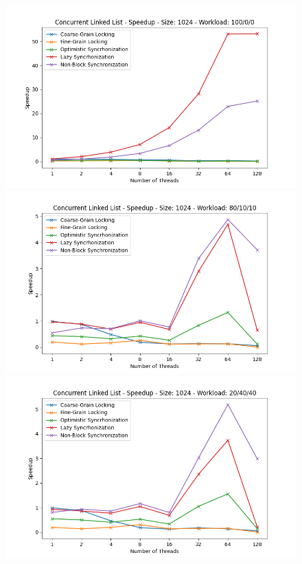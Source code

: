 \documentclass[../final_report.tex]{subfiles}
\begin{document}
\begin{figure}[H]
    \centering
        \includegraphics[scale=0.4]{outFiles/plots/concurrent_data_structs_all_speedup_1024_100_0_0.png}
        \includegraphics[scale=0.4]{outFiles/plots/concurrent_data_structs_all_speedup_1024_80_10_10.png}
        \includegraphics[scale=0.4]{outFiles/plots/concurrent_data_structs_all_speedup_1024_20_40_40.png}

\end{figure}
\end{document}
